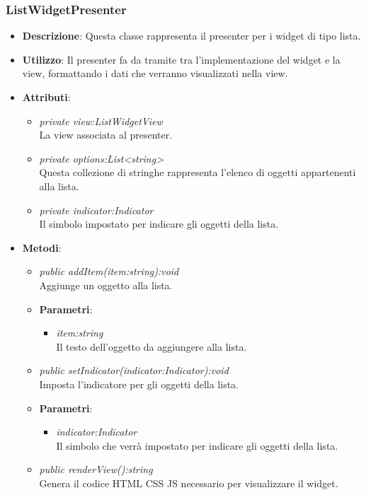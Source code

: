 \subsubsection{ListWidgetPresenter}
\begin{itemize}
\item \textbf{Descrizione}: Questa classe rappresenta il presenter per i widget di tipo lista.
\item \textbf{Utilizzo}: Il presenter fa da tramite tra l'implementazione del widget e la view, formattando i dati che verranno visualizzati nella view.
\item \textbf{Attributi}:
	\begin{itemize}
	\item \textit{private view:ListWidgetView}\\
	La view associata al presenter.
	\item \textit{private options:List<string>}\\
	Questa collezione di stringhe rappresenta l'elenco di oggetti appartenenti alla lista.
	\item \textit{private indicator:Indicator}\\
	Il simbolo impostato per indicare gli oggetti della lista.
	\end{itemize}
\item \textbf{Metodi}:
	\begin{itemize}
	\item \textit{public addItem(item:string):void}\\
	Aggiunge un oggetto alla lista.
		\item{\textbf{Parametri}: \begin{itemize}
		\item \textit{item:string}\\
		Il testo dell'oggetto da aggiungere alla lista.
		\end{itemize}}
	\item \textit{public setIndicator(indicator:Indicator):void}\\
	Imposta l'indicatore per gli oggetti della lista.
		\item{\textbf{Parametri}: \begin{itemize}
		\item \textit{indicator:Indicator}\\
		Il simbolo che verrà impostato per indicare gli oggetti della lista.
		\end{itemize}}
	\item \textit{public renderView():string}\\
	Genera il codice HTML CSS JS necessario per visualizzare il widget.
	\end{itemize}
\end{itemize}

